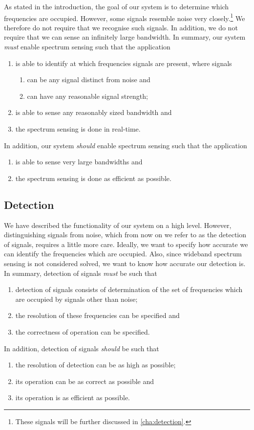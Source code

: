 \documentclass[a4paper, openany, oneside]{memoir}
\begin{document}
As stated in the introduction, the goal of our system is to determine which frequencies are occupied. However, some signals resemble noise very closely.\footnote{These signals will be further discussed in \cref{cha:detection}.} We therefore do not require that we recognise such signals. In addition, we do not require that we can sense an infinitely large bandwidth. In summary, our system \emph{must} enable spectrum sensing such that the application
\begin{enumerate}
    \item is able to identify at which frequencies signals are present, where signals
    \begin{enumerate}
        \item can be any signal distinct from noise and
        \item can have any reasonable signal strength;
    \end{enumerate}
    \item is able to sense any reasonably sized bandwidth and
    \item the spectrum sensing is done in real-time.
\end{enumerate}
In addition, our system \emph{should} enable spectrum sensing such that the application
\begin{enumerate}
    \item is able to sense very large bandwidths and
    \item the spectrum sensing is done as efficient as possible.
\end{enumerate}

\subsection{Detection}
We have described the functionality of our system on a high level. However, distinguishing signals from noise, which from now on we refer to as the detection of signals, requires a little more care. Ideally, we want to specify how accurate we can identify the frequencies which are occupied. Also, since wideband spectrum sensing is not considered solved, we want to know how accurate our detection is.
In summary, detection of signals \emph{must} be such that
\begin{enumerate}
    \item detection of signals consists of determination of the set of frequencies which are occupied by signals other than noise;
    \item the resolution of these frequencies can be specified and
    \item the correctness of operation can be specified.
\end{enumerate}
In addition, detection of signals \emph{should} be such that
\begin{enumerate}
    \item the resolution of detection can be as high as possible;
    \item its operation can be as correct as possible and
    \item its operation is as efficient as possible.
\end{enumerate}
\end{document}
